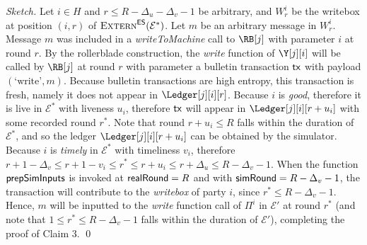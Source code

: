 \begin{proof}[Sketch]
  Let $i \in H$ and $r \leq R - \Delta_u - \Delta_v - 1$ be arbitrary, and $W^i_r$ be the writebox
  at position $(i, r)$ of $\textsc{Extern}^{\textsf{ES}}(\mathcal{E}^*)$. Let $m$ be an arbitrary message
  in $W^i_r$. Message $m$ was included in a \emph{writeToMachine} call to $\RB[j]$
  with parameter $i$ at round $r$. By the rollerblade construction, the \emph{write}
  function of $\Y[j][i]$ will be called by $\RB[j]$ at round $r$ with parameter a bulletin
  transaction $\textsf{tx}$ with payload $(\text{`write'}, m)$. Because bulletin transactions are high entropy,
  this transaction is fresh, namely it does not appear in $\Ledger[j][i][r]$.
  Because $i$ is \emph{good}, therefore it is live in $\mathcal{E}^*$ with liveness $u_i$,
  therefore $\textsf{tx}$ will appear in $\Ledger[j][i][r + u_i]$ with some recorded round $r^*$.
  Note that round $r + u_i \leq R$ falls within the duration of $\mathcal{E}^*$, and
  so the ledger $\Ledger[j][i][r + u_i]$ can be obtained by the simulator.
  Because $i$ is \emph{timely} in $\mathcal{E}^*$ with timeliness $v_i$, therefore
  $r + 1 - \Delta_v \leq r + 1 - v_i \leq r^* \leq r + u_i \leq r + \Delta_u \leq R - \Delta_v - 1$.
  When the function $\textsf{prepSimInputs}$ is invoked at $\textsf{realRound} = R$
  and with $\textsf{simRound} = R - \Delta_v - 1$, the transaction will contribute
  to the \emph{writebox} of party $i$, since $r^* \leq R - \Delta_v - 1$.
  Hence, $m$ will be inputted to the \emph{write} function call of $\Pi^i$
  in $\mathcal{E}'$ at round $r^*$ (and note that $1 \leq r^* \leq R - \Delta_v - 1$ falls
  within the duration of $\mathcal{E}'$), completing the proof of Claim 3.
  \qed
\end{proof}

